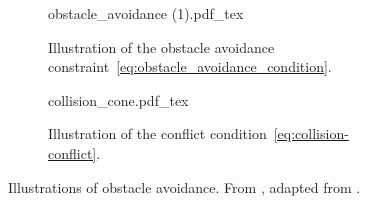 \begin{figure}[t]
    \centering
    \begin{subfigure}[t]{0.45\textwidth}
        \centering
        \def\svgwidth{.8\textwidth}
        {obstacle_avoidance (1).pdf_tex}
        \vspace{-1.15em}
        \caption{Illustration of the obstacle avoidance constraint~\eqref{eq:obstacle_avoidance_condition}.}
        \label{fig:obstacle_radius}
    \end{subfigure}   
    \begin{subfigure}[t]{0.45\textwidth}
        \centering
        \def\svgwidth{.8\textwidth}
        {collision_cone.pdf_tex}
        \vspace{-1.15em}
        \caption{Illustration of the conflict condition~\eqref{eq:collision-conflict}.}
        \label{fig:collision_cone}
    \end{subfigure} 
    \caption{Illustrations of obstacle avoidance. From \cite{lie_formation_2023}, adapted from \cite{matous_singularity-free_2022}. }     
\end{figure}

